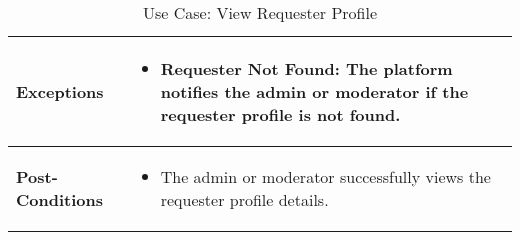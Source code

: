 \begin{table}[!ht]
\begin{tabularx}{\textwidth}{|l|X|}
        \textbf{Exceptions} & 
        \begin{itemize}[label=--,itemsep=0pt]
            \item Requester Not Found: The platform notifies the admin or moderator if the requester profile is not found.
        \end{itemize} \\
        \hline
        \textbf{Post-Conditions} & 
        \begin{itemize}[label=--,itemsep=0pt]
            \item The admin or moderator successfully views the requester profile details.
        \end{itemize} \\
        \hline
    \end{tabularx}
    \caption{Use Case: View Requester Profile}
    \label{tab:use-case-view-requester-profile}
\end{table}


